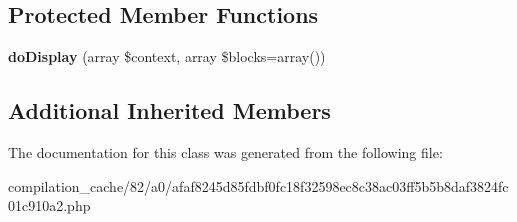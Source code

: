 \subsection*{Protected Member Functions}
\begin{DoxyCompactItemize}
\item 
\hypertarget{class_____twig_template__82a0afaf8245d85fdbf0fc18f32598ec8c38ac03ff5b5b8daf3824fc01c910a2_adb62b7c226e07d30f836ed16158d924f}{}{\bfseries do\+Display} (array \$context, array \$blocks=array())\label{class_____twig_template__82a0afaf8245d85fdbf0fc18f32598ec8c38ac03ff5b5b8daf3824fc01c910a2_adb62b7c226e07d30f836ed16158d924f}

\end{DoxyCompactItemize}
\subsection*{Additional Inherited Members}


The documentation for this class was generated from the following file\+:\begin{DoxyCompactItemize}
\item 
compilation\+\_\+cache/82/a0/afaf8245d85fdbf0fc18f32598ec8c38ac03ff5b5b8daf3824fc01c910a2.\+php\end{DoxyCompactItemize}
